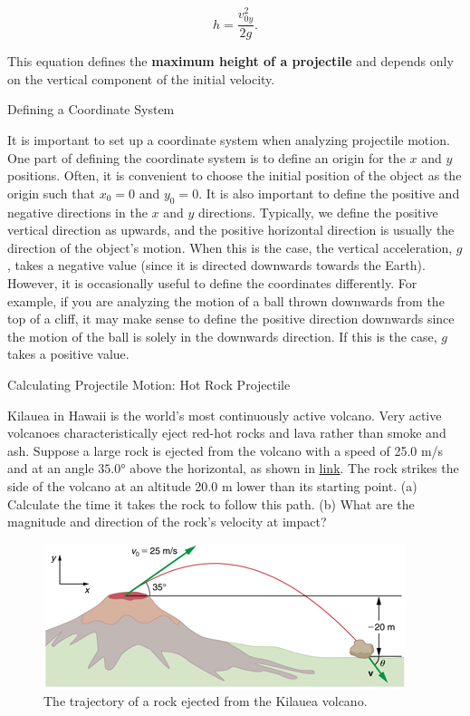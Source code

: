 \documentclass[
]{book}
\begin{document}
\leavevmode{}%
\[{{h = \frac{v_{0y}^{2}}{2g}}\text{.}}{}\]

This equation defines the \textbf{maximum height of a projectile} and depends
only on the vertical component of the initial velocity.

\hypertarget{fs-id1479427}{}
Defining a Coordinate System

It is important to set up a coordinate system when analyzing projectile
motion. One part of defining the coordinate system is to define an
origin for the \(x{}\) and \(y{}\) positions. Often, it is convenient to
choose the initial position of the object as the origin such that
\({x_{0} = 0}{}\) and \({y_{0} = 0}{}\). It is also important to define the
positive and negative directions in the \(x{}\) and \(y{}\) directions.
Typically, we define the positive vertical direction as upwards, and the
positive horizontal direction is usually the direction of the object's
motion. When this is the case, the vertical acceleration, \(g{}\), takes a
negative value (since it is directed downwards towards the Earth).
However, it is occasionally useful to define the coordinates
differently. For example, if you are analyzing the motion of a ball
thrown downwards from the top of a cliff, it may make sense to define
the positive direction downwards since the motion of the ball is solely
in the downwards direction. If this is the case, \(g{}\) takes a positive
value.

\hypertarget{fs-id708626}{}
Calculating Projectile Motion: Hot Rock Projectile

Kilauea in Hawaii is the world's most continuously active volcano. Very
active volcanoes characteristically eject red-hot rocks and lava rather
than smoke and ash. Suppose a large rock is ejected from the volcano
with a speed of 25.0 m/s and at an angle \(\text{35.0°}{}\) above the
horizontal, as shown in
\protect\hyperlink{import-auto-id1817519}{link}. The rock strikes
the side of the volcano at an altitude 20.0 m lower than its starting
point. (a) Calculate the time it takes the rock to follow this path. (b)
What are the magnitude and direction of the rock's velocity at impact?

\begin{figure}
\hypertarget{import-auto-id1817519}{%
\centering
\includegraphics{images/Figure_03_04_04a.jpg}
\caption{The trajectory of a rock ejected from the Kilauea
volcano.}\label{import-auto-id1817519}
}
\end{figure}
\end{document}

